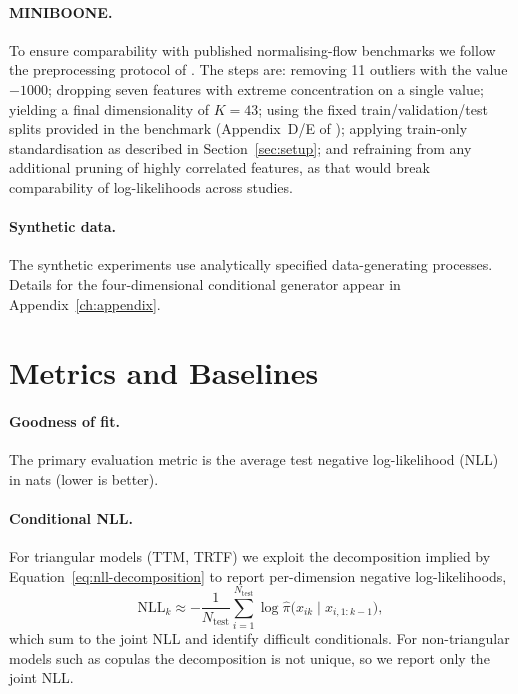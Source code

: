 \documentclass[11pt,a4paper,twoside]{book}\usepackage[]{graphicx}\usepackage[]{xcolor}
\begin{document}
\paragraph{MINIBOONE.} To ensure comparability with published normalising-flow benchmarks we follow the preprocessing protocol of \citet{papamakarios2017masked}. The steps are: removing 11 outliers with the value $-1000$; dropping seven features with extreme concentration on a single value; yielding a final dimensionality of $K=43$; using the fixed train/validation/test splits provided in the benchmark (Appendix~D/E of \citet{papamakarios2017masked}); applying train-only standardisation as described in Section~\ref{sec:setup}; and refraining from any additional pruning of highly correlated features, as that would break comparability of log-likelihoods across studies.

\paragraph{Synthetic data.} The synthetic experiments use analytically specified data-generating processes. Details for the four-dimensional conditional generator appear in Appendix~\ref{ch:appendix}.

\section{Metrics and Baselines}

\paragraph{Goodness of fit.} The primary evaluation metric is the average test negative log-likelihood (NLL) in nats (lower is better).

\paragraph{Conditional NLL.} For triangular models (TTM, TRTF) we exploit the decomposition implied by Equation~\eqref{eq:nll-decomposition} to report per-dimension negative log-likelihoods,
\begin{equation}
  \mathrm{NLL}_k \approx -\frac{1}{N_{\mathrm{test}}} \sum_{i=1}^{N_{\mathrm{test}}} \log \hat{\pi}\big(x_{ik} \mid x_{i,1:k-1}\big),
  \label{eq:eval-conditional-nll}
\end{equation}
which sum to the joint NLL and identify difficult conditionals. For non-triangular models such as copulas the decomposition is not unique, so we report only the joint NLL.
\end{document}
